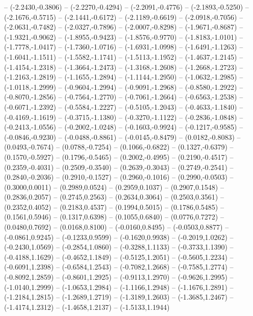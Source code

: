 {	-- (-2.2430,-0.3806)
	-- (-2.2270,-0.4294)
	-- (-2.2091,-0.4776)
	-- (-2.1893,-0.5250)
	-- (-2.1676,-0.5715)
	-- (-2.1441,-0.6172)
	-- (-2.1189,-0.6619)
	-- (-2.0918,-0.7056)
	-- (-2.0631,-0.7482)
	-- (-2.0327,-0.7896)
	-- (-2.0007,-0.8298)
	-- (-1.9671,-0.8687)
	-- (-1.9321,-0.9062)
	-- (-1.8955,-0.9423)
	-- (-1.8576,-0.9770)
	-- (-1.8183,-1.0101)
	-- (-1.7778,-1.0417)
	-- (-1.7360,-1.0716)
	-- (-1.6931,-1.0998)
	-- (-1.6491,-1.1263)
	-- (-1.6041,-1.1511)
	-- (-1.5582,-1.1741)
	-- (-1.5113,-1.1952)
	-- (-1.4637,-1.2145)
	-- (-1.4154,-1.2318)
	-- (-1.3664,-1.2473)
	-- (-1.3168,-1.2608)
	-- (-1.2668,-1.2723)
	-- (-1.2163,-1.2819)
	-- (-1.1655,-1.2894)
	-- (-1.1144,-1.2950)
	-- (-1.0632,-1.2985)
	-- (-1.0118,-1.2999)
	-- (-0.9604,-1.2994)
	-- (-0.9091,-1.2968)
	-- (-0.8580,-1.2922)
	-- (-0.8070,-1.2856)
	-- (-0.7564,-1.2770)
	-- (-0.7061,-1.2664)
	-- (-0.6563,-1.2538)
	-- (-0.6071,-1.2392)
	-- (-0.5584,-1.2227)
	-- (-0.5105,-1.2043)
	-- (-0.4633,-1.1840)
	-- (-0.4169,-1.1619)
	-- (-0.3715,-1.1380)
	-- (-0.3270,-1.1122)
	-- (-0.2836,-1.0848)
	-- (-0.2413,-1.0556)
	-- (-0.2002,-1.0248)
	-- (-0.1603,-0.9924)
	-- (-0.1217,-0.9585)
	-- (-0.0846,-0.9230)
	-- (-0.0488,-0.8861)
	-- (-0.0145,-0.8479)
	-- (0.0182,-0.8083)
	-- (0.0493,-0.7674)
	-- (0.0788,-0.7254)
	-- (0.1066,-0.6822)
	-- (0.1327,-0.6379)
	-- (0.1570,-0.5927)
	-- (0.1796,-0.5465)
	-- (0.2002,-0.4995)
	-- (0.2190,-0.4517)
	-- (0.2359,-0.4031)
	-- (0.2509,-0.3540)
	-- (0.2639,-0.3043)
	-- (0.2749,-0.2541)
	-- (0.2840,-0.2036)
	-- (0.2910,-0.1527)
	-- (0.2960,-0.1016)
	-- (0.2990,-0.0503)
	-- (0.3000,0.0011)
	-- (0.2989,0.0524)
	-- (0.2959,0.1037)
	-- (0.2907,0.1548)
	-- (0.2836,0.2057)
	-- (0.2745,0.2563)
	-- (0.2634,0.3064)
	-- (0.2503,0.3561)
	-- (0.2352,0.4052)
	-- (0.2183,0.4537)
	-- (0.1994,0.5015)
	-- (0.1786,0.5485)
	-- (0.1561,0.5946)
	-- (0.1317,0.6398)
	-- (0.1055,0.6840)
	-- (0.0776,0.7272)
	-- (0.0480,0.7692)
	-- (0.0168,0.8100)
	-- (-0.0160,0.8495)
	-- (-0.0503,0.8877)
	-- (-0.0861,0.9245)
	-- (-0.1233,0.9599)
	-- (-0.1620,0.9938)
	-- (-0.2019,1.0262)
	-- (-0.2430,1.0569)
	-- (-0.2854,1.0860)
	-- (-0.3288,1.1133)
	-- (-0.3733,1.1390)
	-- (-0.4188,1.1629)
	-- (-0.4652,1.1849)
	-- (-0.5125,1.2051)
	-- (-0.5605,1.2234)
	-- (-0.6091,1.2398)
	-- (-0.6584,1.2543)
	-- (-0.7082,1.2668)
	-- (-0.7585,1.2774)
	-- (-0.8092,1.2859)
	-- (-0.8601,1.2925)
	-- (-0.9113,1.2970)
	-- (-0.9626,1.2995)
	-- (-1.0140,1.2999)
	-- (-1.0653,1.2984)
	-- (-1.1166,1.2948)
	-- (-1.1676,1.2891)
	-- (-1.2184,1.2815)
	-- (-1.2689,1.2719)
	-- (-1.3189,1.2603)
	-- (-1.3685,1.2467)
	-- (-1.4174,1.2312)
	-- (-1.4658,1.2137)
	-- (-1.5133,1.1944)
}
